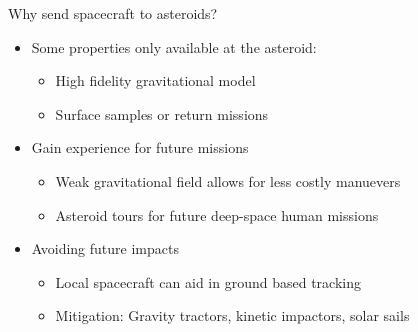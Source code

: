\begin{frame}[t]{Why send spacecraft to asteroids?}
    \begin{itemize}
        \item<1-> Some properties only available at the asteroid:
            \begin{itemize}
                \item High fidelity gravitational model
                \item Surface samples or return missions
            \end{itemize}
        \item<2-> Gain experience for future missions
            \begin{itemize}
                \item Weak gravitational field allows for less costly manuevers
                \item Asteroid tours for future deep-space human missions
            \end{itemize}
        \item<3-> Avoiding future impacts
            \begin{itemize}
                \item Local spacecraft can aid in ground based tracking
                \item Mitigation: Gravity tractors, kinetic impactors, solar sails
            \end{itemize}
    \end{itemize}


\end{frame}